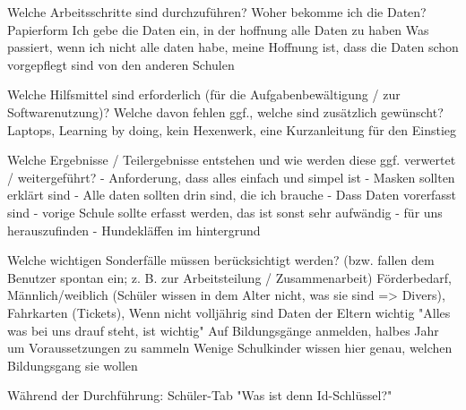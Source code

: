 Welche Arbeitsschritte sind durchzuführen?		
Woher bekomme ich die Daten? Papierform
Ich gebe die Daten ein, in der hoffnung alle Daten zu haben
Was passiert, wenn ich nicht alle daten habe, meine Hoffnung ist, dass die Daten schon vorgepflegt sind von den anderen Schulen				






Welche Hilfsmittel sind erforderlich (für die Aufgabenbewältigung / zur Softwarenutzung)? Welche davon fehlen ggf., welche sind zusätzlich gewünscht?
Laptops, 
Learning by doing, 
kein Hexenwerk, 
eine Kurzanleitung für den Einstieg	 	














Welche Ergebnisse / Teilergebnisse entstehen und wie werden diese ggf. verwertet / weitergeführt?		
- Anforderung, dass alles einfach und simpel ist
- Masken sollten erklärt sind
- Alle daten sollten drin sind, die ich brauche
- Dass Daten vorerfasst sind
- vorige Schule sollte erfasst werden, das ist sonst sehr aufwändig - für uns herauszufinden
- Hundekläffen im hintergrund			






Welche wichtigen Sonderfälle müssen berücksichtigt werden? (bzw. fallen dem Benutzer spontan ein; z. B. zur Arbeitsteilung / Zusammenarbeit)		
Förderbedarf, 
Männlich/weiblich (Schüler wissen in dem Alter nicht, was sie sind => Divers),
Fahrkarten (Tickets),
Wenn nicht volljährig sind Daten der Eltern wichtig
"Alles was bei uns drauf steht, ist wichtig"
Auf Bildungsgänge anmelden, halbes Jahr um Voraussetzungen zu sammeln
Wenige Schulkinder wissen hier genau, welchen Bildungsgang sie wollen
		






Während der Durchführung:						
Schüler-Tab
"Was ist denn Id-Schlüssel?"				





















